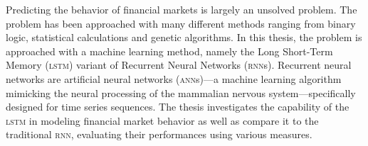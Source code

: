 \begin{center}
  \textbf{}

  \vspace{3mm}

  \parbox{0.8\textwidth}{
    Predicting the behavior of financial markets is largely an unsolved
    problem.  The problem has been approached with many different methods
    ranging from binary logic, statistical calculations and genetic algorithms.
    In this thesis, the problem is approached with a machine learning method,
    namely the Long Short-Term Memory (\textsc{lstm}) variant of Recurrent
    Neural Networks (\textsc{rnn}s).  Recurrent neural networks are artificial
    neural networks (\textsc{ann}s)---a machine learning algorithm mimicking the
    neural processing of the mammalian nervous system---specifically designed
    for time series sequences.  The thesis investigates the capability of the
    \textsc{lstm} in modeling financial market behavior as well as compare it to
    the traditional \textsc{rnn}, evaluating their performances using various
    measures.
  }
\end{center}
